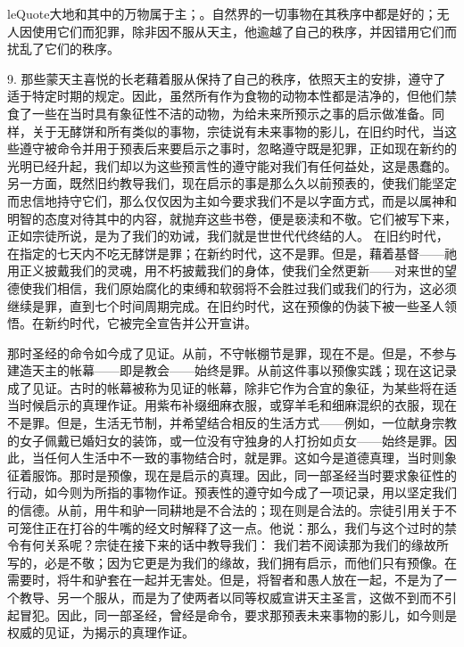 leQuote{大地和其中的万物属于主}；。自然界的一切事物在其秩序中都是好的；无人因使用它们而犯罪，除非因不服从天主，他逾越了自己的秩序，并因错用它们而扰乱了它们的秩序。\par

9. 那些蒙天主喜悦的长老藉着服从保持了自己的秩序，依照天主的安排，遵守了适于特定时期的规定。因此，虽然所有作为食物的动物本性都是洁净的，但他们禁食了一些在当时具有象征性不洁的动物，为给未来所预示之事的启示做准备。同样，关于无酵饼和所有类似的事物，宗徒说有未来事物的影儿，在旧约时代，当这些遵守被命令并用于预表后来要启示之事时，忽略遵守既是犯罪，正如现在新约的光明已经升起，我们却以为这些预言性的遵守能对我们有任何益处，这是愚蠢的。另一方面，既然旧约教导我们，现在启示的事是那么久以前预表的，使我们能坚定而忠信地持守它们，那么仅仅因为主如今要求我们不是以字面方式，而是以属神和明智的态度对待其中的内容，就抛弃这些书卷，便是亵渎和不敬。它们被写下来，正如宗徒所说，是为了我们的劝诫，我们就是世世代代终结的人。  在旧约时代，在指定的七天内不吃无酵饼是罪；在新约时代，这不是罪。但是，藉着基督——祂用正义披戴我们的灵魂，用不朽披戴我们的身体，使我们全然更新——对来世的望德使我们相信，我们原始腐化的束缚和软弱将不会胜过我们或我们的行为，这必须继续是罪，直到七个时间周期完成。在旧约时代，这在预像的伪装下被一些圣人领悟。在新约时代，它被完全宣告并公开宣讲。\par

那时圣经的命令如今成了见证。从前，不守帐棚节是罪，现在不是。但是，不参与建造天主的帐幕——即是教会——始终是罪。从前这件事以预像实践；现在这记录成了见证。古时的帐幕被称为见证的帐幕，除非它作为合宜的象征，为某些将在适当时候启示的真理作证。用紫布补缀细麻衣服，或穿羊毛和细麻混织的衣服，现在不是罪。但是，生活无节制，并希望结合相反的生活方式——例如，一位献身宗教的女子佩戴已婚妇女的装饰，或一位没有守独身的人打扮如贞女——始终是罪。因此，当任何人生活中不一致的事物结合时，就是罪。这如今是道德真理，当时则象征着服饰。那时是预像，现在是启示的真理。因此，同一部圣经当时要求象征性的行动，如今则为所指的事物作证。预表性的遵守如今成了一项记录，用以坚定我们的信德。从前，用牛和驴一同耕地是不合法的；现在则是合法的。宗徒引用关于不可笼住正在打谷的牛嘴的经文时解释了这一点。他说：那么，我们与这个过时的禁令有何关系呢？宗徒在接下来的话中教导我们： 我们若不阅读那为我们的缘故所写的，必是不敬；因为它更是为我们的缘故，我们拥有启示，而他们只有预像。在需要时，将牛和驴套在一起并无害处。但是，将智者和愚人放在一起，不是为了一个教导、另一个服从，而是为了使两者以同等权威宣讲天主圣言，这做不到而不引起冒犯。因此，同一部圣经，曾经是命令，要求那预表未来事物的影儿，如今则是权威的见证，为揭示的真理作证。\par

